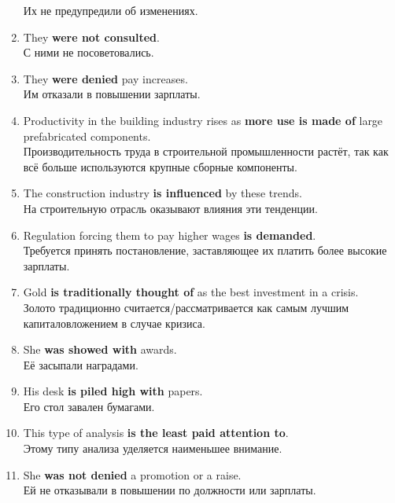 \documentclass[main.tex]{subfiles}
\begin{document}
\begin{enumerate}[nosep,leftmargin=*]
	Их не предупредили об изменениях.
	\item They \textbf{were not consulted}.\\
	С ними не посоветовались.
	\item They \textbf{were denied} pay increases.\\
	Им отказали в повышении зарплаты.
	\item Productivity in the building industry rises as \textbf{more use is made of} large prefabricated components.\\
	Производительность труда в строительной промышленности растёт, так как всё больше используются крупные сборные компоненты.
	\item The construction industry \textbf{is influenced} by these trends.\\
	На строительную отрасль оказывают влияния эти тенденции.
	\item Regulation forcing them to pay higher wages \textbf{is demanded}.\\
	Требуется принять постановление, заставляющее их платить более высокие зарплаты.
	\item Gold \textbf{is traditionally thought of} as the best investment in a crisis.\\
	Золото традиционно считается/рассматривается как самым лучшим капиталовложением в случае кризиса.
	\item She \textbf{was showed with} awards.\\
	Её засыпали наградами.
	\item His desk \textbf{is piled high with} papers.\\
	Его стол завален бумагами.
	\item This type of analysis \textbf{is the least paid attention to}.\\
	Этому типу анализа уделяется наименьшее внимание.
	\item She \textbf{was not denied} a promotion or a raise.\\
	Ей не отказывали в повышении по должности или зарплаты.
\end{enumerate}
\ 

\end{document}
